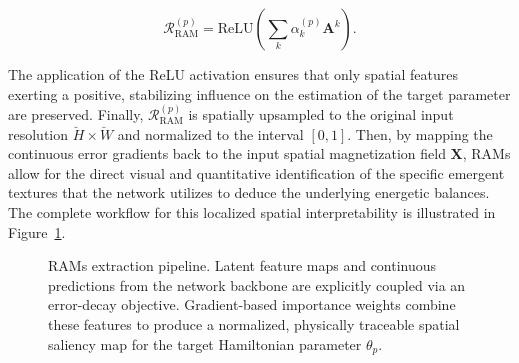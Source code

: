 \documentclass[letterpaper, 12, one column]{article}
\begin{document}
\begin{equation}\label{eq:RAM_Formulation}
\mathbf{\mathcal{R}}_{\text{RAM}}^{(p)} = \text{ReLU} \left( \sum_k \alpha_k^{(p)} \mathbf{A}^k \right).
\end{equation}

The application of the ReLU activation ensures that only spatial features exerting a positive, stabilizing influence on the estimation of the target parameter are preserved. Finally, $\mathcal{R}_{\text{RAM}}^{(p)}$ is spatially upsampled to the original input resolution $\breve{H} \times \breve{W}$ and normalized to the interval $[0,1]$. Then, by mapping the continuous error gradients back to the input spatial magnetization field $\mathbf{X}$, RAMs allow for the direct visual and quantitative identification of the specific emergent textures that the network utilizes to deduce the underlying energetic balances. The complete workflow for this localized spatial interpretability is illustrated in Figure~\ref{fig:rams_pipeline}.


\begin{figure}[H]
  \centering
  \vspace{0.3cm}
  \resizebox{0.65\linewidth}{!}{
  
  }
  \caption{RAMs extraction pipeline. Latent feature maps and continuous predictions from the network backbone are explicitly coupled via an error-decay objective. Gradient-based importance weights combine these features to produce a normalized, physically traceable spatial saliency map for the target Hamiltonian parameter $\theta_{p}$.}
  \label{fig:rams_pipeline}
\end{figure}
\end{document}
